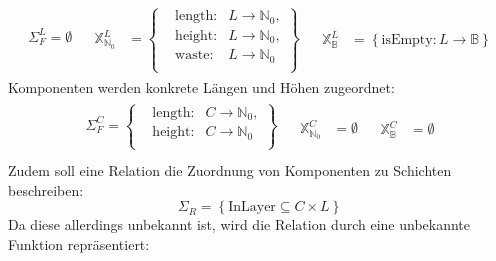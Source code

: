 \[
    \begin{array}{lll}
        \begin{aligned}
            \Sigma_{F}^{L} = \emptyset \\[5pt]
        \end{aligned}
        &
        \begin{aligned}
            \mathbb{X}_{\mathbb{N}_0}^{L} &= \left\{
            \begin{aligned}
                & \text{length}: & L \rightarrow \mathbb{N}_0, \\
                & \text{height}: & L \rightarrow \mathbb{N}_0, \\
                & \text{waste}: & L \rightarrow \mathbb{N}_0 \; \\
            \end{aligned} \right\}
        \end{aligned}
        &
        \begin{aligned}
            \mathbb{X}_{\mathbb{B}}^{L} &= \left\{ \text{isEmpty}: L \rightarrow \mathbb{B} \right\}
        \end{aligned}
    \end{array}
\]
Komponenten werden konkrete Längen und Höhen zugeordnet:
\[
    \begin{array}{lll}
        \begin{aligned}
            \Sigma_{F}^{C} = \left\{
            \begin{aligned}
                & \text{length}: & C \rightarrow \mathbb{N}_0, \\
                & \text{height}: & C \rightarrow \mathbb{N}_0 \; \\
            \end{aligned} \right\} \\[5pt]
        \end{aligned}
        &
        \begin{aligned}
            \mathbb{X}_{\mathbb{N}_0}^{C} &= \emptyset
        \end{aligned}
        &
        \begin{aligned}
            \mathbb{X}_{\mathbb{B}}^{C} &= \emptyset
        \end{aligned}
    \end{array}
\]
Zudem soll eine Relation die Zuordnung von Komponenten zu Schichten beschreiben:
\[
    \Sigma_{R} = \left\{ \text{InLayer} \subseteq C \times L \right\}
\]
Da diese allerdings unbekannt ist, wird die Relation durch eine unbekannte Funktion repräsentiert:

